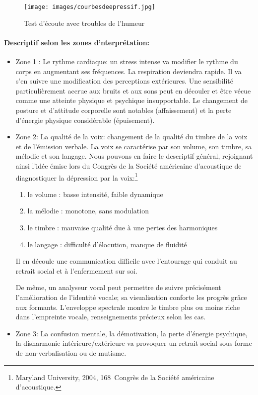 \begin{figure}[ht]
	\centering
	\texttt{[image: images/courbesdeepressif.jpg]}
	\caption{Test d'écoute avec troubles de l'humeur}
	\label{fig:courbes du dépressif}
\end{figure}


\paragraph{Descriptif selon les zones d'nterprétation:}

\begin{itemize}
	\item Zone 1 :  Le rythme cardiaque: un stress intense va modifier le rythme
	du corps en augmentant ses fréquences. La respiration deviendra
	rapide. Il va s'en suivre une modification des perceptions
	extérieures. Une sensibilité particulièrement accrue aux bruits et
	aux sons peut en découler et être vécue comme une
	atteinte physique et psychique insupportable.
	Le changement de posture et d'attitude corporelle sont
	notables (affaissement) et la perte d'énergie physique considérable (épuisement).
	\item Zone 2: La qualité de la voix: changement de la qualité du timbre de la
	voix et de l'émission verbale.
	La voix se caractérise par son volume, son timbre, sa mélodie et son
	langage. Nous pouvons en faire le
	descriptif général, rejoignant ainsi l'idée émise lors du Congrès de la Société
	américaine d'acoustique \autocite{le_service_metronews}
	de diagnostiquer la
	dépression par la voix:\footnote{Maryland University, 2004, 168\ieme\ Congrès de la Société
		américaine d'acoustique.}
		\begin{enumerate}
		\item le volume : basse intensité, faible dynamique
		\item la mélodie : monotone, sans modulation
		\item le timbre : mauvaise qualité due à une pertes des harmoniques
		\item le langage : difficulté d'élocution, manque de fluidité
	\end{enumerate}
	Il en découle une communication difficile avec l'entourage qui
	conduit au retrait social et à l'enfermement sur soi.
	
	De même, un analyseur vocal peut permettre de suivre précisément l'amélioration de
	l'identité vocale; sa visualisation conforte les progrès grâce aux
	formants. L'enveloppe spectrale montre le timbre plus ou moins riche
	dans l'empreinte vocale, renseignements précieux selon les cas.
	
	\item Zone 3: La confusion mentale, la démotivation, la perte d'énergie
	psychique, la disharmonie intérieure/extérieure va provoquer un retrait social sous forme de 
	non-verbalisation ou de mutisme.
\end{itemize}


